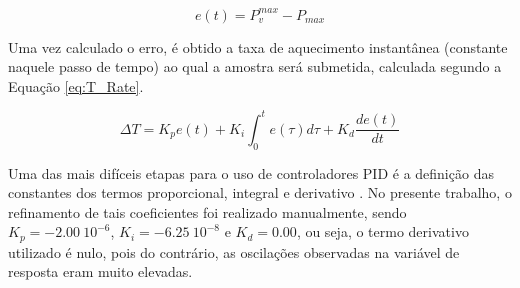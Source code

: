 \begin{equation}
  \label{eq:erro_pid}
  e(t) = P_v^{max} - P_{max}
\end{equation}

Uma vez calculado o erro, é obtido a taxa de aquecimento instantânea (constante
naquele passo de tempo) ao qual a amostra será submetida, calculada segundo a
Equação \ref{eq:T_Rate}.

\begin{equation}
  \label{eq:T_Rate}
  \Delta T = K_{p} e(t)+K_{i} \int_{0}^{t} e(\tau) d \tau+K_{d} \frac{d e(t)}{d t}
\end{equation}

Uma das mais difíceis etapas para o uso de controladores PID é a definição das
constantes dos termos proporcional, integral e derivativo \cite{ogata2002}. No
presente trabalho, o refinamento de tais coeficientes foi realizado manualmente,
sendo $K_p = - 2.00 \ 10^{-6}$, $K_i= -6.25 \ 10^{-8}$ e $K_d = 0.00$, ou seja,
o termo derivativo utilizado é nulo, pois do contrário, as oscilações observadas
na variável de resposta eram muito elevadas.
 
  
